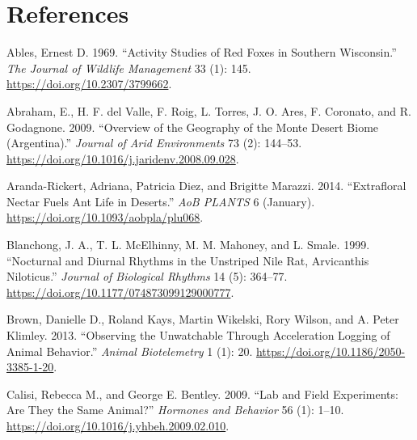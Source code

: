 \documentclass[msc,numbers,hidelinks]{coppe}
\newlength{\cslhangindent}
\newenvironment{cslreferences}%
  {\setlength{\parindent}{0pt}%
  \everypar{\setlength{\hangindent}{\cslhangindent}}\ignorespaces}%
  {\par}
\begin{document}
  \hypertarget{references}{%
  \chapter*{References}\label{references}}

  \noindent

  \setlength{\parindent}{-0.20in}
  \setlength{\leftskip}{0.20in}
  \setlength{\parskip}{8pt}

  \hypertarget{refs}{}
  \begin{cslreferences}
  \leavevmode\hypertarget{ref-ablesActivityStudiesRed1969}{}%
  Ables, Ernest D. 1969. ``Activity Studies of Red Foxes in Southern Wisconsin.'' \emph{The Journal of Wildlife Management} 33 (1): 145. \url{https://doi.org/10.2307/3799662}.

  \leavevmode\hypertarget{ref-abrahamOverviewGeographyMonte2009}{}%
  Abraham, E., H. F. del Valle, F. Roig, L. Torres, J. O. Ares, F. Coronato, and R. Godagnone. 2009. ``Overview of the Geography of the Monte Desert Biome (Argentina).'' \emph{Journal of Arid Environments} 73 (2): 144--53. \url{https://doi.org/10.1016/j.jaridenv.2008.09.028}.

  \leavevmode\hypertarget{ref-aranda-rickertExtrafloralNectarFuels2014}{}%
  Aranda-Rickert, Adriana, Patricia Diez, and Brigitte Marazzi. 2014. ``Extrafloral Nectar Fuels Ant Life in Deserts.'' \emph{AoB PLANTS} 6 (January). \url{https://doi.org/10.1093/aobpla/plu068}.

  \leavevmode\hypertarget{ref-blanchongNocturnalDiurnalRhythms1999}{}%
  Blanchong, J. A., T. L. McElhinny, M. M. Mahoney, and L. Smale. 1999. ``Nocturnal and Diurnal Rhythms in the Unstriped Nile Rat, Arvicanthis Niloticus.'' \emph{Journal of Biological Rhythms} 14 (5): 364--77. \url{https://doi.org/10.1177/074873099129000777}.

  \leavevmode\hypertarget{ref-brownObservingUnwatchableAcceleration2013}{}%
  Brown, Danielle D., Roland Kays, Martin Wikelski, Rory Wilson, and A. Peter Klimley. 2013. ``Observing the Unwatchable Through Acceleration Logging of Animal Behavior.'' \emph{Animal Biotelemetry} 1 (1): 20. \url{https://doi.org/10.1186/2050-3385-1-20}.

  \leavevmode\hypertarget{ref-calisiLabFieldExperiments2009}{}%
  Calisi, Rebecca M., and George E. Bentley. 2009. ``Lab and Field Experiments: Are They the Same Animal?'' \emph{Hormones and Behavior} 56 (1): 1--10. \url{https://doi.org/10.1016/j.yhbeh.2009.02.010}.


\end{cslreferences}
\end{document}
